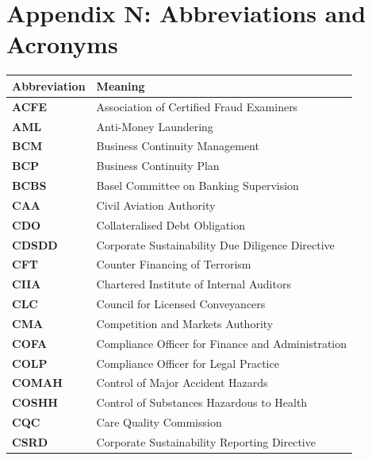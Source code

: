 \chapter*{Appendix N: Abbreviations and Acronyms}
\label{chap:Appendix N: Abbreviations and Acronyms}

\begin{longtable}{ | >{\raggedright\arraybackslash}p{} 
                  | >{\raggedright\arraybackslash}p{} | }
  \hline
  \textbf{Abbreviation} & \textbf{Meaning} \\
  \hline
  \endhead
  \endfoot
        \textbf{ACFE} & Association of Certified Fraud Examiners \\
        \hline
        \textbf{AML} & Anti-Money Laundering \\
        \hline
        \textbf{BCM} & Business Continuity Management \\
        \hline
        \textbf{BCP} & Business Continuity Plan \\
        \hline
        \textbf{BCBS} & Basel Committee on Banking Supervision \\
        \hline
        \textbf{CAA} & Civil Aviation Authority \\
        \hline
        \textbf{CDO} & Collateralised Debt Obligation \\
        \hline
        \textbf{CDSDD} & Corporate Sustainability Due Diligence Directive \\
        \hline
        \textbf{CFT} & Counter Financing of Terrorism \\
        \hline
        \textbf{CIIA} & Chartered Institute of Internal Auditors \\
        \hline
        \textbf{CLC} & Council for Licensed Conveyancers \\
        \hline
        \textbf{CMA} & Competition and Markets Authority \\
        \hline
        \textbf{COFA} & Compliance Officer for Finance and Administration \\
        \hline
        \textbf{COLP} & Compliance Officer for Legal Practice \\
        \hline
        \textbf{COMAH} & Control of Major Accident Hazards \\
        \hline
        \textbf{COSHH} & Control of Substances Hazardous to Health \\
        \hline
        \textbf{CQC} & Care Quality Commission \\
        \hline
        \textbf{CSRD} & Corporate Sustainability Reporting Directive \\

\end{longtable}
